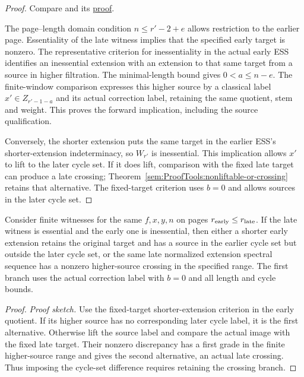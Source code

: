 \begin{proof}
Compare \cite[Proposition 6.20]{LWX126} and its
\href{paper/main.tex.html#L1995}{proof}.

The page--length domain condition $n\le r'-2+e$ allows restriction to the earlier page. Essentiality of the late witness implies that the specified early target is nonzero. The representative criterion for inessentiality in the actual early ESS identifies an inessential extension with an extension to that same target from a source in higher filtration. The minimal-length bound gives $0<a\le n-e$. The finite-window comparison expresses this higher source by a classical label $x'\in Z_{r'-1-a}$ and its actual correction label, retaining the same quotient, stem and weight. This proves the forward implication, including the source qualification.

Conversely, the shorter extension puts the same target in the earlier
ESS's shorter-extension indeterminacy, so $W_{r'}$ is inessential.
This implication allows $x'$ to lift to the later cycle set. If it
does lift, comparison with the fixed late target can produce a late
crossing; Theorem~\ref{sem:ProofTools:nonliftable-or-crossing} retains
that alternative. The fixed-target criterion uses $b=0$ and allows sources in the later cycle set.
\end{proof}

\begin{theorem}
\label{sem:ProofTools:nonliftable-or-crossing}
Consider finite witnesses for the same $f,x,y,n$ on pages $r_{\rm early}\leq r_{\rm late}$. If the late witness is essential and the early one is inessential, then either a shorter early extension retains the original target and has a source in the earlier cycle set but outside the later cycle set, or the same late normalized extension spectral sequence has a nonzero higher-source crossing in the specified range. The first branch uses the actual correction label with $b=0$ and all length and cycle bounds.
\end{theorem}
\begin{proof}
\textit{Proof sketch.}
Use the fixed-target shorter-extension criterion in the early quotient. If its higher source has no corresponding later cycle label, it is the first alternative. Otherwise lift the source label and compare the actual image with the fixed late target. Their nonzero discrepancy has a first grade in the finite higher-source range and gives the second alternative, an actual late crossing. Thus imposing the cycle-set difference requires retaining the crossing branch.
\end{proof}

